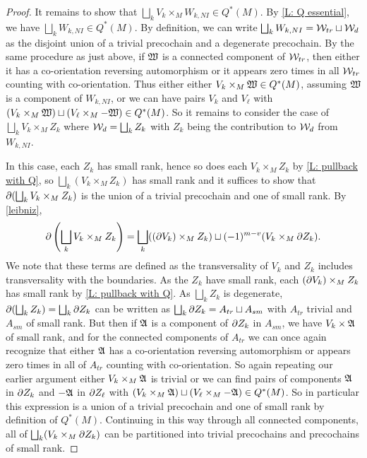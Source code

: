 \begin{proof}
It remains to show that $\bigsqcup_k V_k \times_M W_{k,NI} \in Q^*(M)$. By \cref{L: Q essential}, we have $\bigsqcup_k W_{k,NI} \in Q^*(M)$. By definition, we can write $\bigsqcup_k W_{k,NI} = \mathcal{W}_{tr}\sqcup \mathcal{W}_{d}$ as the disjoint union of a trivial precochain and a degenerate precochain. By the same procedure as just above, if $\mathfrak W$ is a connected component of $\mathcal{W}_{tr}$, then either it has a co-orientation reversing automorphism or it appears zero times in all $\mathcal{W}_{tr}$ counting with co-orientation. Thus either either $V_k \times_M \mathfrak W \in Q^*(M)$, assuming $\mathfrak W$ is a component of $W_{k,NI}$, or we can have pairs $V_k$ and $V_\ell$ with $(V_k \times_M \mathfrak W)\sqcup (V_\ell \times_M -\mathfrak W) \in Q^*(M)$. So it remains to consider the case of $\bigsqcup_k V_k \times_M Z_k$ where $\mathcal{W}_d = \bigsqcup_k Z_k$ with $Z_k$ being the contribution to $\mathcal{W}_d$ from $W_{k,NI}$.

In this case, each $Z_k$ has small rank, hence so does each $V_k \times_M Z_k$ by \cref{L: pullback with Q}, so $\bigsqcup_k (V_k \times_M Z_k)$ has small rank and it suffices to show that $\partial (\bigsqcup_k V_k \times_M Z_k)$ is the union of a trivial precochain and one of small rank. By \cref{leibniz},
$$\partial \left(\bigsqcup_k V_k \times_M Z_k\right) = \bigsqcup_k ((\partial V_k) \times_M Z_k )\sqcup (-1)^{m-v} (V_k \times_M \partial Z_k).$$
We note that these terms are defined as the transversality of $V_k$ and $Z_k$ includes transversality with the boundaries. As the $Z_k$ have small rank, each $(\partial V_k) \times_M Z_k$ has small rank by \cref{L: pullback with Q}. As $\bigsqcup_k Z_k$ is degenerate, $\partial (\bigsqcup_k Z_k) = \bigsqcup_k \partial Z_k$ can be written as $\bigsqcup_k\partial Z_k = A_{tr}\sqcup A_{sm}$ with $A_{tr}$ trivial and $A_{sm}$ of small rank. But then if $\mathfrak A$ is a component of $\partial Z_k$ in $A_{sm}$, we have $V_k \times \mathfrak A$ of small rank, and for the connected components of $A_{tr}$ we can once again recognize that either $\mathfrak A$ has a co-orientation reversing automorphism or appears zero times in all of $A_{tr}$ counting with co-orientation. So again repeating our earlier argument either $V_k \times_M \mathfrak A$ is trivial or we can find pairs of components $\mathfrak A$ in $\partial Z_k$ and $-\mathfrak A$ in $\partial Z_\ell$ with $(V_k \times_M \mathfrak A)\sqcup (V_\ell \times_M -\mathfrak A) \in Q^*(M)$. So in particular this expression is a union of a trivial precochain and one of small rank by definition of $Q^*(M)$. Continuing in this way through all connected components, all of $\bigsqcup_k(V_k \times_M \partial Z_k)$ can be partitioned into trivial precochains and precochains of small rank.
\end{proof}


